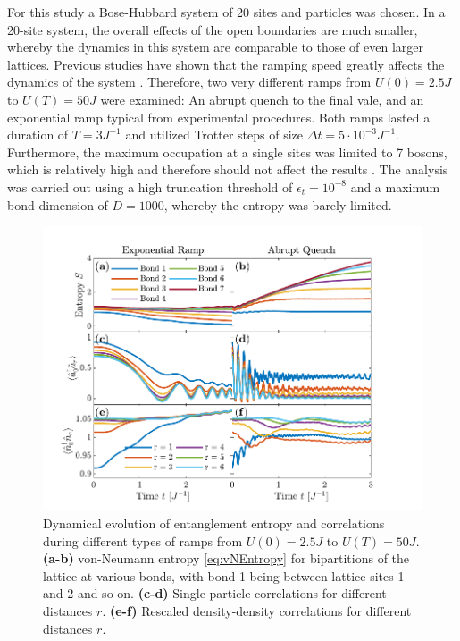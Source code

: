 For this study a Bose-Hubbard system of 20 sites and particles was chosen. In a 20-site system, the overall effects of the open boundaries are much smaller, whereby the dynamics in this system are comparable to those of even larger lattices.
Previous studies have shown that the ramping speed greatly affects the dynamics of the system \cite{Lauchli2008,Braun2015}. Therefore, two very different ramps from $U(0) = 2.5 J$ to $U(T) = 50 J$ were examined: An abrupt quench to the final vale, and an exponential ramp typical from experimental procedures. Both ramps lasted a duration of $T = 3 J^{-1}$ and utilized Trotter steps of size $\Delta t = 5 \cdot 10^{-3} J^{-1}$. Furthermore, the maximum occupation at a single sites was limited to 7 bosons, which is relatively high and therefore should not affect the results \cite{Braun2015}. The analysis was carried out using a high truncation threshold of $\epsilon_t = 10^{-8}$ and a maximum bond dimension of $D = 1000$, whereby the entropy was barely limited.\\
\begin{figure}[h!]
    \centering
    \includegraphics[width=\textwidth]{Figures/L20/EntanglementGrowth.pdf}
    \caption{Dynamical evolution of entanglement entropy and correlations during different types of ramps from $U(0) = 2.5 J$ to $U(T) = 50 J$. \textbf{(a-b)} von-Neumann entropy \eqref{eq:vNEntropy} for bipartitions of the lattice at various bonds, with bond 1 being between lattice sites 1 and 2 and so on. \textbf{(c-d)} Single-particle correlations for different distances $r$. \textbf{(e-f)} Rescaled density-density correlations for different distances $r$.}
    \label{fig:EntanglementGrowth}
\end{figure}

